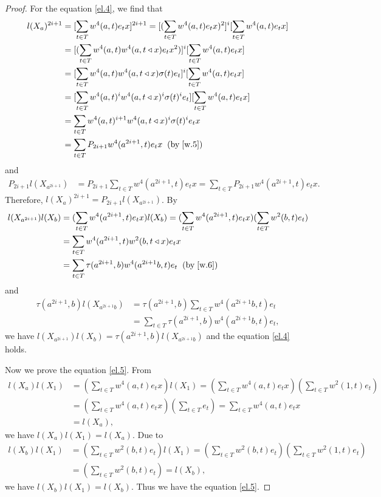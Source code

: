 \documentclass[a4paper,11pt]{amsart}
\numberwithin{equation}{section}
\begin{document}
\begin{proof}
For the equation \eqref{el.4}, we find that
\begin{align*}
l(X_a)^{2i+1}&=[\sum\limits_{t \in T}w^4(a,t)e_t x]^{2i+1}=[(\sum\limits_{t \in T}w^4(a,t)e_t x)^2]^{i} [\sum\limits_{t \in T}w^4(a,t)e_t x]\\
&=[(\sum\limits_{t \in T}w^4(a,t) w^4(a,t\triangleleft x) e_t x^2)]^{i} [\sum\limits_{t \in T}w^4(a,t)e_t x]\\
&=[\sum\limits_{t \in T}w^4(a,t) w^4(a,t\triangleleft x) \sigma(t) e_t]^{i} [\sum\limits_{t \in T}w^4(a,t)e_t x]\\
&=[\sum\limits_{t \in T}w^4(a,t)^i w^4(a,t\triangleleft x)^i \sigma(t)^i e_t] [\sum\limits_{t \in T}w^4(a,t)e_t x]\\
&=\sum\limits_{t \in T}w^4(a,t)^{i+1} w^4(a,t\triangleleft x)^i \sigma(t)^i e_t x\\
&=\sum\limits_{t \in T}P_{2i+1} w^4(a^{2i+1},t)e_t x \;\;(\text{by}\;\eqref{w.5})
\end{align*}
and
\begin{align*}
P_{2i+1}l(X_{a^{2i+1}})&=P_{2i+1}\sum\limits_{t \in T} w^4(a^{2i+1},t)e_t x=\sum\limits_{t \in T} P_{2i+1} w^4(a^{2i+1},t)e_t x.
\end{align*}
Therefore, $l(X_a)^{2i+1}=P_{2i+1}l(X_{a^{2i+1}})$. By
\begin{align*}
l(X_{a^{2i+1}})l(X_b)&=(\sum\limits_{t \in T}w^4(a^{2i+1},t)e_t x) l(X_b)=(\sum\limits_{t \in T}w^4(a^{2i+1},t)e_t x) (\sum\limits_{t \in T}w^2(b,t)e_t)\\
&=\sum\limits_{t \in T}w^4(a^{2i+1},t) w^2(b,t \triangleleft x) e_t x\\
&=\sum\limits_{t \in T}\tau(a^{2i+1},b) w^4(a^{2i+1}b,t) e_t \;\;(\text{by}\;\eqref{w.6})
\end{align*}
and
\begin{align*}
\tau(a^{2i+1},b) l(X_{a^{2i+1}b})&=\tau(a^{2i+1},b) \sum\limits_{t \in T}w^4(a^{2i+1}b,t) e_t\\
&=\sum\limits_{t \in T}\tau(a^{2i+1},b) w^4(a^{2i+1}b,t) e_t,
\end{align*}
we have $l(X_{a^{2i+1}})l(X_b)=\tau(a^{2i+1},b) l(X_{a^{2i+1}b})$ and the equation \eqref{el.4} holds.

Now we prove the equation \eqref{el.5}. From
\begin{align*}
l(X_a)l(X_1)&=(\sum\limits_{t \in T}w^4(a,t)e_t x) l(X_1)=(\sum\limits_{t \in T}w^4(a,t)e_t x) (\sum\limits_{t \in T}w^2(1,t)e_t)\\
&=(\sum\limits_{t \in T}w^4(a,t)e_t x) (\sum\limits_{t \in T}e_t)=\sum\limits_{t \in T}w^4(a,t)e_t x\\
&=l(X_a),
\end{align*}
we have $l(X_a)l(X_1)=l(X_a)$. Due to
\begin{align*}
l(X_b)l(X_1)&=(\sum\limits_{t \in T}w^2(b,t)e_t) l(X_1)=(\sum\limits_{t \in T}w^2(b,t)e_t) (\sum\limits_{t \in T}w^2(1,t)e_t)\\
&=(\sum\limits_{t \in T}w^2(b,t)e_t)=l(X_b),
\end{align*}
we have $l(X_b)l(X_1)=l(X_b)$. Thus we have the equation \eqref{el.5}.



\end{proof}
\end{document}
